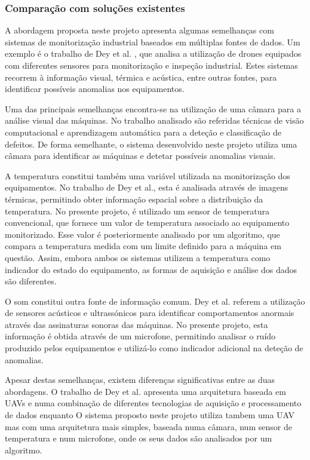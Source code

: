 \documentclass[conference,a4paper]{IEEEtran}
\begin{document}
\subsubsection{Comparação com soluções existentes}

A abordagem proposta neste projeto apresenta algumas semelhanças com sistemas de monitorização industrial baseados em múltiplas fontes de dados. Um exemplo é o trabalho de Dey et al. \cite{Dey2026}, que analisa a utilização de drones equipados com diferentes sensores para monitorização e inspeção industrial. Estes sistemas recorrem à informação visual, térmica e acústica, entre outras fontes, para identificar possíveis anomalias nos equipamentos.

Uma das principais semelhanças encontra-se na utilização de uma câmara para a análise visual das máquinas. No trabalho analisado são referidas técnicas de visão computacional e aprendizagem automática para a deteção e classificação de defeitos. De forma semelhante, o sistema desenvolvido neste projeto utiliza uma câmara para identificar as máquinas e detetar possíveis anomalias visuais.

A temperatura constitui também uma variável utilizada na monitorização dos equipamentos. No trabalho de Dey et al., esta é analisada através de imagens térmicas, permitindo obter informação espacial sobre a distribuição da temperatura. No presente projeto, é utilizado um sensor de temperatura convencional, que fornece um valor de temperatura associado ao equipamento monitorizado. Esse valor é posteriormente analisado por um algoritmo, que compara a temperatura medida com um limite definido para a máquina em questão. Assim, embora ambos os sistemas utilizem a temperatura como indicador do estado do equipamento, as formas de aquisição e análise dos dados são diferentes.

O som constitui outra fonte de informação comum. Dey et al. referem a utilização de sensores acústicos e ultrassónicos para identificar comportamentos anormais através das assinaturas sonoras das máquinas. No presente projeto, esta informação é obtida através de um microfone, permitindo analisar o ruído produzido pelos equipamentos e utilizá-lo como indicador adicional na deteção de anomalias.

Apesar destas semelhanças, existem diferenças significativas entre as duas abordagens. O trabalho de Dey et al. apresenta uma arquitetura baseada em UAVs e numa combinação de diferentes tecnologias de aquisição e processamento de dados enquanto O sistema proposto neste projeto utiliza tambem uma UAV mas com uma arquitetura mais simples, baseada numa câmara, num sensor de temperatura e num microfone, onde os seus dados são analisados por um algoritmo.
\end{document}
